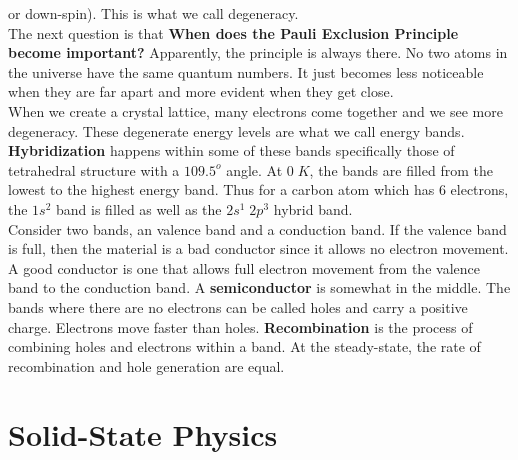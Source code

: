 \documentclass{article}
\begin{document}
or down-spin). This is what we call degeneracy.
\vspace{8pt}
\\The next question is that \textbf{When does the Pauli Exclusion Principle become 
important?} Apparently, the principle is always there. No two atoms in the universe have 
the same quantum numbers. It just becomes less noticeable when they are far apart and
more evident when they get close. 
\vspace{8pt}
\\ When we create a crystal lattice, many electrons come together and we see more 
degeneracy. These degenerate energy levels are what we call energy bands. 
\textbf{Hybridization} happens within some of these bands specifically those of 
tetrahedral structure with a $109.5^{o}$ angle. At $0\;K$, the bands are filled from  
the lowest to the highest energy band. Thus for a carbon atom which has 6 electrons,
the $1s^2$ band is filled as well as the $2s^{1}\; 2p^{3}$ hybrid band. 
\vspace{8pt}
\\ Consider two bands, an valence band and a conduction band. If the valence band is full,
then the material is a bad conductor since it allows no electron movement. A good conductor 
is one that allows full electron movement from the valence band to the conduction band.
A \textbf{semiconductor} is somewhat in the middle. The bands where there are no 
electrons can be called holes and carry a positive charge. Electrons move faster than
holes. \textbf{Recombination} is the process of combining holes and electrons within
a band. At the steady-state, the rate of recombination and hole generation are equal.

\section{Solid-State Physics}
\noindent 
\end{document}
